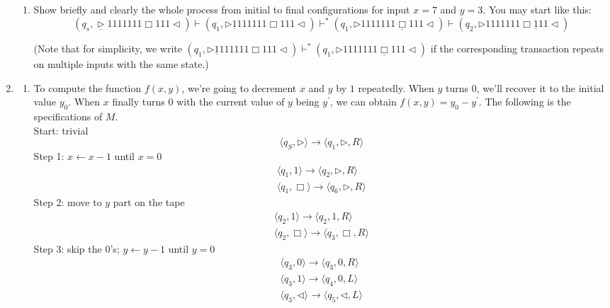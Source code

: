\documentclass[12pt,a4paper]{article}
\makeatletter
\newtheorem*{solution}{Solution}
\theoremstyle{definition}
\renewenvironment{solution}[1][Solution] {\par\pushQED{\qed}\normalfont\topsep6\p@\@plus6\p@\relax\trivlist\item[\hskip\labelsep\bfseries#1\@addpunct{.}]\ignorespaces}{\popQED\endtrivlist\@endpefalse} \makeatother
\makeatother
\begin{document}
\begin{enumerate}
\begin{enumerate}
	\item
	Show briefly and clearly the whole process from initial to final configurations for input $x = 7$ and $y = 3$. You may start like this:
	$$(q_s,\underline{\triangleright}  1  1  1  1  1  1  1  \Box 1  1  1   \triangleleft)
	\vdash (q_1,\triangleright  \underline{1}  1  1  1  1  1  1  \Box 1  1  1   \triangleleft)
	\vdash^* (q_1,\triangleright  1  1  1  1  1  1  1  \underline{\Box} 1  1  1   \triangleleft)
	\vdash (q_2,\triangleright  1  1  1  1  1  1  1  \Box \underline{1}  1  1   \triangleleft)$$
	
	\par{\color{blue}(Note that for simplicity, we write $(q_1,\triangleright  \underline{1}  1  1  1  1  1  1  \Box 1  1  1   \triangleleft)\vdash^* (q_1,\triangleright  1  1  1  1  1  1  1  \underline{\Box} 1  1  1   \triangleleft)$ if the corresponding transaction repeats on multiple inputs with the same state.)}
	
\end{enumerate}
\begin{solution}
	\hfill
	\begin{enumerate}
		\item 
		To compute the function $f(x,y)$, we're going to decrement $x$ and $y$ by $1$ repeatedly. When $y$ turns $0$, we'll recover it to the initial value $y_0$. When $x$ finally turns $0$ with the current value of $y$ being $y^{\prime}$, we can obtain $f(x,y) = y_0 - y^{\prime}$. The following is the specifications of $M$. \\
		Start: trivial
		\[\langle q_S,\triangleright\rangle\rightarrow\langle q_1,\triangleright,R\rangle\]
		Step 1: $x \leftarrow x-1$ until $x = 0$
		\begin{gather*}
			\langle q_1,1\rangle\rightarrow\langle q_2,\triangleright,R\rangle \\
			\langle q_1,\Box\rangle\rightarrow\langle q_6,\triangleright,R\rangle
		\end{gather*}
		Step 2: move to $y$ part on the tape
		\begin{gather*}
			\langle q_2,1\rangle\rightarrow\langle q_2,1,R\rangle \\
			\langle q_2,\Box\rangle\rightarrow\langle q_3,\Box,R\rangle
		\end{gather*}
		Step 3: skip the $0$'s; $y \leftarrow y-1$ until $y=0$
		\begin{gather*}
			\langle q_3,0\rangle\rightarrow\langle q_3,0,R\rangle \\
			\langle q_3,1\rangle\rightarrow\langle q_4,0,L\rangle \\
			\langle q_3,\triangleleft\rangle\rightarrow\langle q_5,\triangleleft,L\rangle 
		\end{gather*}
		

\end{enumerate}
\end{solution}
\end{enumerate}
\end{document}
